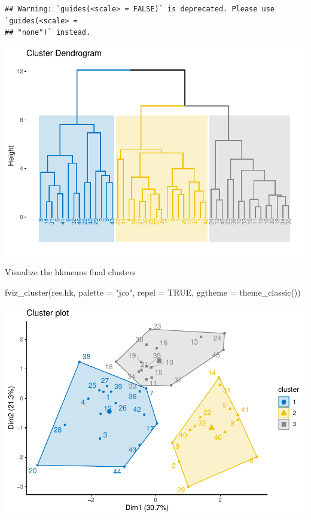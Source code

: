 \documentclass[
]{article}
\newenvironment{Shaded}{\begin{snugshade}}{\end{snugshade}}
\newcommand{\AttributeTok}[1]{\textcolor[rgb]{0.77,0.63,0.00}{#1}}
\newcommand{\ConstantTok}[1]{\textcolor[rgb]{0.00,0.00,0.00}{#1}}
\newcommand{\FunctionTok}[1]{\textcolor[rgb]{0.00,0.00,0.00}{#1}}
\newcommand{\NormalTok}[1]{#1}
\newcommand{\StringTok}[1]{\textcolor[rgb]{0.31,0.60,0.02}{#1}}
\begin{document}
\begin{verbatim}
## Warning: `guides(<scale> = FALSE)` is deprecated. Please use `guides(<scale> =
## "none")` instead.
\end{verbatim}

\includegraphics{clustering_files/figure-latex/unnamed-chunk-69-1.pdf}

Visualize the hkmeans final clusters

\begin{Shaded}
\begin{Highlighting}[]
\FunctionTok{fviz\_cluster}\NormalTok{(res.hk, }\AttributeTok{palette =} \StringTok{"jco"}\NormalTok{, }\AttributeTok{repel =} \ConstantTok{TRUE}\NormalTok{,}
             \AttributeTok{ggtheme =} \FunctionTok{theme\_classic}\NormalTok{())}
\end{Highlighting}
\end{Shaded}

\includegraphics{clustering_files/figure-latex/unnamed-chunk-70-1.pdf}
\end{document}

